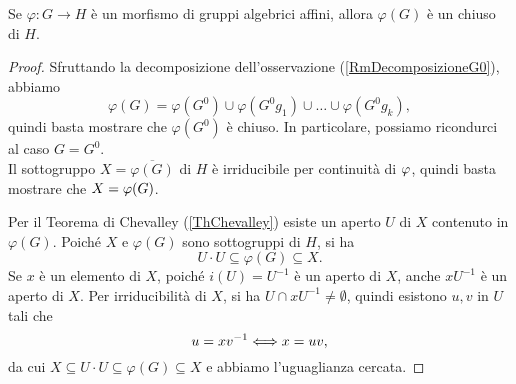 \begin{proposition}\label{PrMorfismoTraGruppiAlgebriciAffiniHaImmagineChiusa}
    Se $\varphi\colon G \to H$ è un morfismo di gruppi algebrici affini, allora $\varphi(G)$ è un chiuso di $H$.
\end{proposition}
\begin{proof}
    Sfruttando la decomposizione dell'osservazione (\ref{RmDecomposizioneG0}), abbiamo
    \[\varphi(G)=\varphi(G^0) \cup \varphi(G^0 g_1) \cup \ldots\cup \varphi(G^0g_k),\]
    quindi basta mostrare che $\varphi(G^0)$ è chiuso. In particolare, possiamo ricondurci al caso $G=G^0$. \\
    Il sottogruppo $X=\overline{\varphi(G)}$ di $H$ è irriducibile per continuit\`a di $\varphi$, quindi basta mostrare che $X=\varphi(G)$.
    
    
    Per il Teorema di Chevalley (\ref{ThChevalley}) esiste un aperto $U$ di $X$ contenuto in $\varphi(G)$. Poiché $X$ e $\varphi(G)$ sono sottogruppi di $H$, si ha \[U\cdot U \subseteq \varphi(G)\subseteq X.\]
    Se $x$ è un elemento di $X$, poiché $i(U)=U^{-1}$ è un aperto di $X$, anche $xU^{-1}$ è un aperto di $X$. Per irriducibilità di $X$, si ha $U\cap xU^{-1} \ne \emptyset$, quindi esistono $u,v$ in $U$ tali che 
    \[u=xv^{-1}\Longleftrightarrow x=uv,\] da cui $X\subseteq U\cdot U \subseteq \varphi(G)\subseteq X$ e abbiamo l'uguaglianza cercata.
\end{proof}



